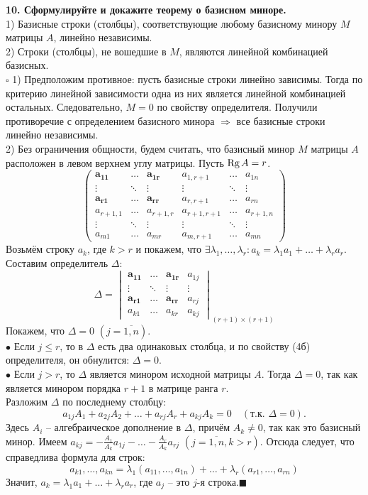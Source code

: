 \documentclass[11pt,a4paper]{article}
\newcommand{\Rg}[1]{\mathrm{Rg}\hspace{0.5mm}#1}
\newcommand{\proof}{$\square$ }
\newcommand{\qed}{\hfill$\blacksquare$}
\begin{document}
\textbf{10. Сформулируйте и докажите теорему о базисном миноре.\\}
1) Базисные строки (столбцы), соответствующие любому базисному минору $M$ матрицы $A$, линейно независимы.\\
2) Строки (столбцы), не вошедшие в $M$, являются линейной комбинацией базисных.\\
\proof 1) Предположим противное: пусть базисные строки линейно зависимы. Тогда по критерию линейной зависимости одна из них является линейной комбинацией остальных. Следовательно, $M = 0$ по свойству определителя. Получили противоречие с определением базисного минора $\Rightarrow$ все базисные строки линейно независимы.\\
2) Без ограничения общности, будем считать, что базисный минор $M$ матрицы $A$ расположен в левом верхнем углу матрицы. Пусть $\Rg{A} = r$.
$$\left( \begin{matrix}
\boldsymbol{a_{11}} & \hdots & \boldsymbol{a_{1r}} & a_{1, r+1} & \hdots & a_{1n} \\  
\vdots & \ddots & \vdots & \vdots & \ddots & \vdots \\
\boldsymbol{a_{r1}} & \hdots & \boldsymbol{a_{rr}} & a_{r, r+1} & \hdots & a_{rn} \\
a_{r+1, 1} & \hdots & a_{r+1, r} & a_{r+1, r+1} & \hdots & a_{r+1, n} \\
\vdots & \ddots & \vdots & \vdots & \ddots & \vdots \\
a_{m1} & \hdots & a_{mr} & a_{m, r+1} & \hdots & a_{mn}
\end{matrix} \right)$$
Возьмём строку $a_k$, где $k > r$ и покажем, что $\exists \lambda_1, \hdots, \lambda_r : a_k = \lambda_1 a_1 + \hdots + \lambda_r a_r$. Составим определитель $\Delta$:
$$\Delta =
\begin{vmatrix}
\boldsymbol{a_{11}} & \hdots & \boldsymbol{a_{1r}} & a_{1j} \\
\vdots & \ddots & \vdots & \vdots \\
\boldsymbol{a_{r1}} & \hdots & \boldsymbol{a_{rr}} & a_{rj} \\
a_{k1} & \hdots & a_{kr} & a_{kj}
\end{vmatrix}_{(r+1) \times (r+1)}$$
Покажем, что $\Delta = 0$ $(j = \overline{1, n})$.\\
$\bullet$ Если $j \leq r$, то в $\Delta$ есть два одинаковых столбца, и по свойству (4б) определителя, он обнулится: $\Delta = 0$.\\
$\bullet$ Если $j > r$, то $\Delta$ является минором исходной матрицы $A$. Тогда $\Delta = 0$, так как является минором порядка $r+1$ в матрице ранга $r$.\\
Разложим $\Delta$ по последнему столбцу:
$$a_{1j} A_1 + a_{2j} A_2 + \hdots + a_{rj} A_r + a_{kj} A_k = 0 \quad (\text{т.к. } \Delta = 0).$$
Здесь $A_i$ -- алгебраическое дополнение в $\Delta$, причём $A_k \neq 0$, так как это базисный минор. Имеем $a_{kj} = -\frac{A_1}{A_k} a_{1j} - \hdots - \frac{A_r}{A_k} a_{rj}$ $(j = \overline{1, n}, k > r)$. Отсюда следует, что справедлива формула для строк: $$a_{k1}, \hdots, a_{kn} = \lambda_1 (a_{11}, \hdots, a_{1n}) + \hdots + \lambda_r (a_{r1}, \hdots, a_{rn})$$
Значит, $a_k = \lambda_1 a_1 + \hdots + \lambda_r a_r$, где $a_j$ -- это $j$-я строка.\qed
\end{document}
